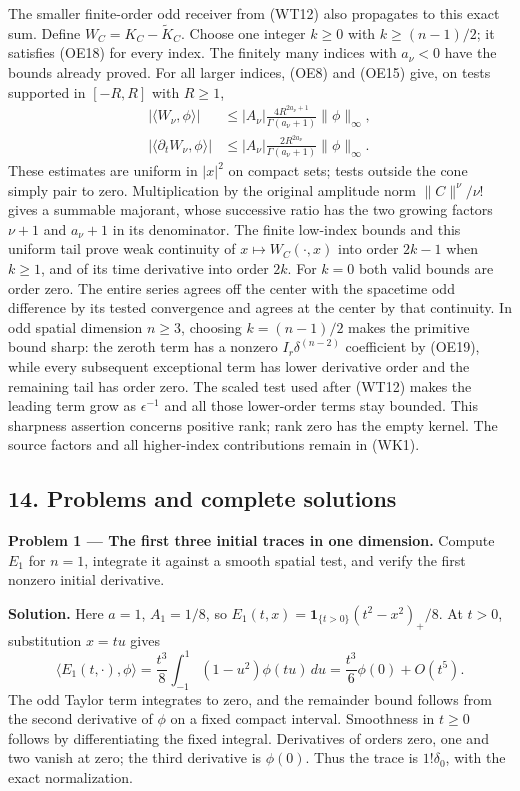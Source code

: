 \documentclass[
  11pt,
]{article}
\begin{document}
The smaller finite-order odd receiver from (WT12) also propagates to
this exact sum. Define \(W_C=K_C-\widetilde K_C\). Choose one integer
\(k\geq0\) with \(k\geq(n-1)/2\); it satisfies (OE18) for every index.
The finitely many indices with \(a_\nu<0\) have the bounds already
proved. For all larger indices, (OE8) and (OE15) give, on tests
supported in \([-R,R]\) with \(R\geq1\), \[
\begin{split}
 |\langle W_\nu,\phi\rangle|
   &\leq |A_\nu|\frac{4R^{2a_\nu+1}}{\Gamma(a_\nu+1)}
                         \|\phi\|_\infty,\\
 |\langle\partial_tW_\nu,\phi\rangle|
   &\leq |A_\nu|\frac{2R^{2a_\nu}}{\Gamma(a_\nu+1)}
                         \|\phi\|_\infty .
\end{split}
 \tag{WK7}
\] These estimates are uniform in \(|x|^2\) on compact sets; tests
outside the cone simply pair to zero. Multiplication by the original
amplitude norm \(\|C\|^\nu/\nu!\) gives a summable majorant, whose
successive ratio has the two growing factors \(\nu+1\) and \(a_\nu+1\)
in its denominator. The finite low-index bounds and this uniform tail
prove weak continuity of \(x\mapsto W_C(\cdot,x)\) into order \(2k-1\)
when \(k\geq1\), and of its time derivative into order \(2k\). For
\(k=0\) both valid bounds are order zero. The entire series agrees off
the center with the spacetime odd difference by its tested convergence
and agrees at the center by that continuity. In odd spatial dimension
\(n\geq3\), choosing \(k=(n-1)/2\) makes the primitive bound sharp: the
zeroth term has a nonzero \(I_r\delta^{(n-2)}\) coefficient by (OE19),
while every subsequent exceptional term has lower derivative order and
the remaining tail has order zero. The scaled test used after (WT12)
makes the leading term grow as \(\epsilon^{-1}\) and all those
lower-order terms stay bounded. This sharpness assertion concerns
positive rank; rank zero has the empty kernel. The source factors and
all higher-index contributions remain in (WK1).

\subsection{14. Problems and complete
solutions}\label{problems-and-complete-solutions}

\textbf{Problem 1 --- The first three initial traces in one dimension.}
Compute \(E_1\) for \(n=1\), integrate it against a smooth spatial test,
and verify the first nonzero initial derivative.

\textbf{Solution.} Here \(a=1\), \(A_1=1/8\), so
\(E_1(t,x)=\boldsymbol1_{\{t>0\}}(t^2-x^2)_+/8\). At \(t>0\),
substitution \(x=tu\) gives \[
 \langle E_1(t,\cdot),\phi\rangle
     =\frac{t^3}{8}\int_{-1}^{1}(1-u^2)\phi(tu)\,du
     =\frac{t^3}{6}\phi(0)+O(t^5).
 \tag{WP1}
\] The odd Taylor term integrates to zero, and the remainder bound
follows from the second derivative of \(\phi\) on a fixed compact
interval. Smoothness in \(t\geq0\) follows by differentiating the fixed
integral. Derivatives of orders zero, one and two vanish at zero; the
third derivative is \(\phi(0)\). Thus the trace is \(1!\delta_0\), with
the exact normalization.
\end{document}
